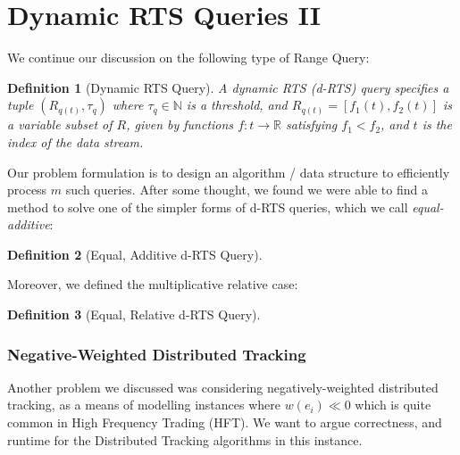 \documentclass{article}
\newtheorem{definition}{Definition}
\begin{document}
\hspace{95mm}

\section*{Dynamic RTS Queries II}

We continue our discussion on the following type of Range Query: 

\begin{definition}[Dynamic RTS Query] A dynamic RTS (\textit{d-RTS}) query specifies a tuple $(R_{q(t)}, \tau_q)$ where $\tau_q \in \mathbb{N}$
    is a threshold, and $R_{q(t)} =[f_1(t), f_2(t)]$ is a variable subset of $R$, given by functions $f: t\rightarrow\mathbb{R}$ satisfying $f_1 < f_2$, and $t$ is the index of the data stream.
\end{definition}

Our problem formulation is to design an algorithm / data structure to efficiently process $m$ such queries. After some thought, we found we were able to find a method to solve one of the simpler forms of d-RTS queries, which we call \textit{equal-additive}:

\begin{definition}[Equal, Additive d-RTS Query]
    
\end{definition}

Moreover, we defined the multiplicative relative case: 

\begin{definition}[Equal, Relative d-RTS Query]
    
\end{definition}



\subsubsection*{Negative-Weighted Distributed Tracking}
Another problem we discussed was considering negatively-weighted distributed tracking, as a means of modelling instances where $w(e_i) \ll 0$ which is quite common in High Frequency Trading (HFT). We want to argue correctness, and runtime for the Distributed Tracking algorithms in this instance.
\end{document}
